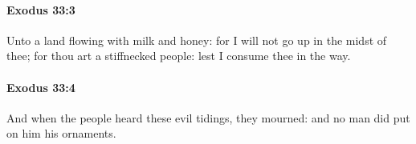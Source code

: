 		\paragraph{Exodus 33:3} %
			\label{EXODUS-33-3}

			Unto a land flowing with milk and honey: for I will not go up in the midst of thee; for thou art a stiffnecked people: lest I consume thee in the way.


		\paragraph{Exodus 33:4} %
			\label{EXODUS-33-4}

			And when the people heard these evil tidings, they mourned: and no man did put on him his ornaments.


